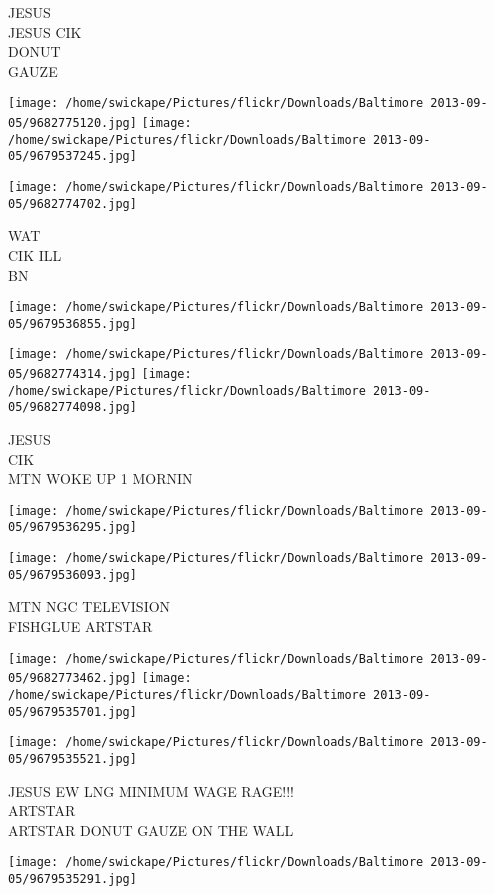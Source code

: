 \documentclass[10pt,letterpaper]{article}
\begin{document}
JESUS\\
JESUS CIK\\
DONUT\\
GAUZE
\pagebreak

\texttt{[image: /home/swickape/Pictures/flickr/Downloads/Baltimore 2013-09-05/9682775120.jpg]}
\texttt{[image: /home/swickape/Pictures/flickr/Downloads/Baltimore 2013-09-05/9679537245.jpg]}

\vspace{0.25in}
\texttt{[image: /home/swickape/Pictures/flickr/Downloads/Baltimore 2013-09-05/9682774702.jpg]}

WAT\\
CIK ILL\\
BN
\pagebreak

\texttt{[image: /home/swickape/Pictures/flickr/Downloads/Baltimore 2013-09-05/9679536855.jpg]}

\vspace{0.25in}
\texttt{[image: /home/swickape/Pictures/flickr/Downloads/Baltimore 2013-09-05/9682774314.jpg]}
\texttt{[image: /home/swickape/Pictures/flickr/Downloads/Baltimore 2013-09-05/9682774098.jpg]}

JESUS\\
CIK\\
MTN WOKE UP 1 MORNIN
\pagebreak

\texttt{[image: /home/swickape/Pictures/flickr/Downloads/Baltimore 2013-09-05/9679536295.jpg]}

\vspace{0.25in}
\texttt{[image: /home/swickape/Pictures/flickr/Downloads/Baltimore 2013-09-05/9679536093.jpg]}

MTN NGC TELEVISION\\
FISHGLUE ARTSTAR
\pagebreak

\texttt{[image: /home/swickape/Pictures/flickr/Downloads/Baltimore 2013-09-05/9682773462.jpg]}
\texttt{[image: /home/swickape/Pictures/flickr/Downloads/Baltimore 2013-09-05/9679535701.jpg]}

\texttt{[image: /home/swickape/Pictures/flickr/Downloads/Baltimore 2013-09-05/9679535521.jpg]}

JESUS EW LNG MINIMUM WAGE RAGE!!!\\
ARTSTAR\\
ARTSTAR DONUT GAUZE ON THE WALL
\pagebreak

\texttt{[image: /home/swickape/Pictures/flickr/Downloads/Baltimore 2013-09-05/9679535291.jpg]}
\end{document}
